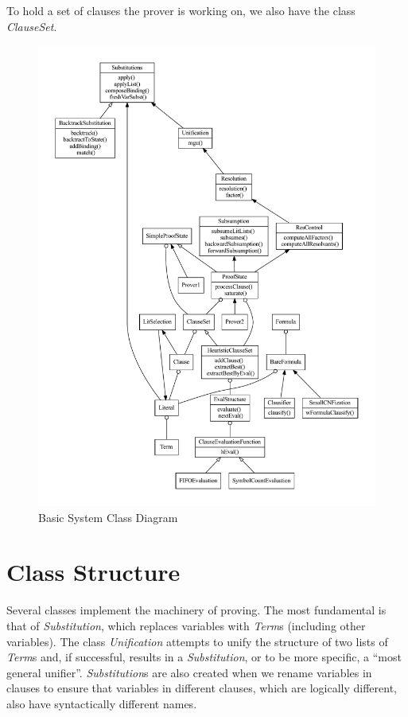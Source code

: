 \documentclass{llncs}
\begin{document}
To hold a set of clauses the prover is working on, we also have the
class \emph{ClauseSet}.

\begin{figure}
  \centering
  \includegraphics[width=6in]{architecture.pdf}
  \caption{Basic System Class Diagram}
  \label{fig:SysArch}
\end{figure}

\section{Class Structure}

Several classes implement the machinery of proving.  The most
fundamental is that of \emph{Substitution}, which replaces variables
with \emph{Term}s (including other variables).  The class
\emph{Unification} attempts to unify the structure of two lists of
\emph{Term}s and, if successful, results in a \emph{Substitution}, or to be
more specific, a ``most general unifier''.  \emph{Substitution}s
are also created when we rename variables in clauses to ensure that
variables in different clauses, which are logically different, also
have syntactically different names.
\end{document}
